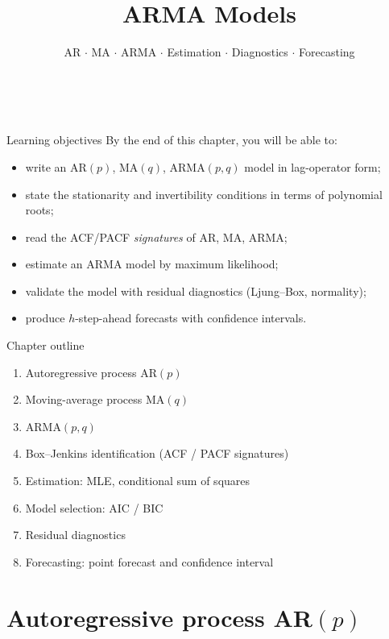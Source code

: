 \documentclass[aspectratio=169]{beamer}
\title[\moduleNom\ -- Ch.5]{ARMA Models}
\subtitle{AR $\cdot$ MA $\cdot$ ARMA $\cdot$ Estimation $\cdot$ Diagnostics $\cdot$ Forecasting}
\author{\auteurNom \\ \footnotesize\auteurEmail}
\institute{\auteurInstitution}
\date{\anneeUniversitaire}
\begin{document}
\begin{frame}\titlepage\end{frame}

\begin{frame}{Learning objectives}
  By the end of this chapter, you will be able to:
  \begin{itemize}
    \item write an AR$(p)$, MA$(q)$, ARMA$(p,q)$ model in lag-operator
          form;
    \item state the stationarity and invertibility conditions in
          terms of polynomial roots;
    \item read the ACF/PACF \emph{signatures} of AR, MA, ARMA;
    \item estimate an ARMA model by maximum likelihood;
    \item validate the model with residual diagnostics
          (Ljung--Box, normality);
    \item produce $h$-step-ahead forecasts with confidence
          intervals.
  \end{itemize}
\end{frame}

\begin{frame}{Chapter outline}
  \begin{enumerate}
    \item Autoregressive process AR$(p)$
    \item Moving-average process MA$(q)$
    \item ARMA$(p,q)$
    \item Box--Jenkins identification (ACF / PACF signatures)
    \item Estimation: MLE, conditional sum of squares
    \item Model selection: AIC / BIC
    \item Residual diagnostics
    \item Forecasting: point forecast and confidence interval
  \end{enumerate}
\end{frame}

\section{Autoregressive process AR$(p)$}
\end{document}
